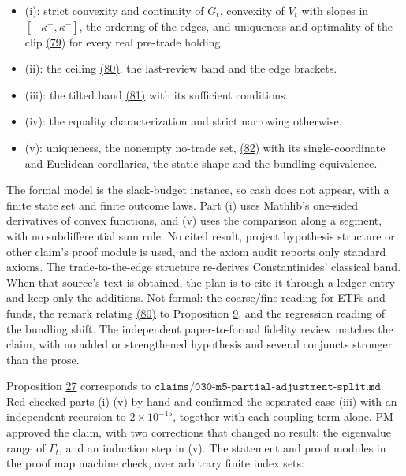 \documentclass[11pt]{article}
\begin{document}
\begin{itemize}
  \item (i): strict convexity and continuity of \(G_t\), convexity of \(V_t\)
  with slopes in \([-\kappa^+,\kappa^-]\), the ordering of the edges, and
  uniqueness and optimality of the clip \hyperref[eq:79]{(79)} for every real
  pre-trade holding.
  \item (ii): the ceiling \hyperref[eq:80]{(80)}, the last-review band and the edge brackets.
  \item (iii): the tilted band \hyperref[eq:81]{(81)} with its sufficient conditions.
  \item (iv): the equality characterization and strict narrowing otherwise.
  \item (v): uniqueness, the nonempty no-trade set, \hyperref[eq:82]{(82)} with its
  single-coordinate and Euclidean corollaries, the static shape and
  the bundling equivalence.
\end{itemize}

The formal model is the slack-budget instance, so cash does not
appear, with a finite state set and finite outcome laws. Part (i)
uses Mathlib's one-sided derivatives of convex functions, and (v)
uses the comparison along a segment, with no subdifferential sum
rule. No cited result, project hypothesis structure or other claim's
proof module is used, and the axiom audit reports only standard
axioms. The trade-to-the-edge structure re-derives Constantinides'
classical band. When that source's text is obtained, the plan is to
cite it through a ledger entry and keep only the additions. Not
formal: the coarse/fine reading for ETFs and funds, the remark
relating \hyperref[eq:80]{(80)} to Proposition \hyperref[res:Proposition-9]{9}, and the regression reading of the
bundling shift. The independent paper-to-formal fidelity review
matches the claim, with no added or strengthened hypothesis and
several conjuncts stronger than the prose.

Proposition \hyperref[res:Proposition-27]{27} corresponds to
\(\texttt{claims/030-m5-partial-adjustment-split.md}\). Red checked
parts (i)-(v) by hand and confirmed the separated case (iii) with an
independent recursion to \(2\times10^{-15}\), together with each coupling
term alone. PM approved the claim, with two corrections that changed
no result: the eigenvalue range of \(\Gamma_t\), and an induction step
in (v). The statement and proof modules in the proof map machine
check, over arbitrary finite index sets:
\end{document}
